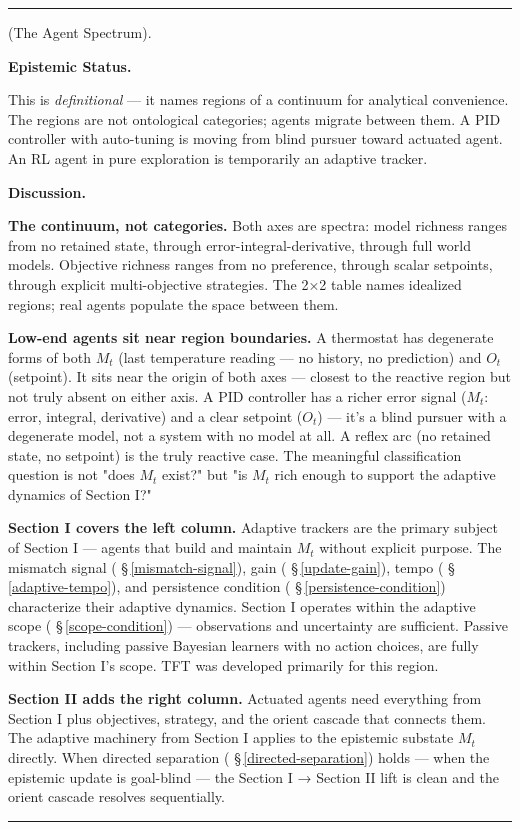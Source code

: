 \documentclass[11pt,oneside]{article}
\newcounter{claim}[section]
\renewcommand{\theclaim}{\thesection.\arabic{claim}}
\newenvironment{segment}[2]{%
  \refstepcounter{claim}%
  \bigskip\noindent\hrule\smallskip
  \noindent{\bfseries #1~\theclaim}\enskip(#2).\par\smallskip
  \noindent\ignorespaces
}{%
  \par\smallskip\noindent\hrule\bigskip
}
\newenvironment{definition}[1][]{\begin{segment}{Definition}{#1}}{\end{segment}}
\begin{document}
\begin{definition}[The Agent Spectrum]
\medskip\noindent\textbf{Epistemic Status.}


This is \textit{definitional} — it names regions of a continuum for analytical convenience. The regions are not ontological categories; agents migrate between them. A PID controller with auto-tuning is moving from blind pursuer toward actuated agent. An RL agent in pure exploration is temporarily an adaptive tracker.


\medskip\noindent\textbf{Discussion.}


\textbf{The continuum, not categories.} Both axes are spectra: model richness ranges from no retained state, through error-integral-derivative, through full world models. Objective richness ranges from no preference, through scalar setpoints, through explicit multi-objective strategies. The 2×2 table names idealized regions; real agents populate the space between them.

\textbf{Low-end agents sit near region boundaries.} A thermostat has degenerate forms of both $M_t$ (last temperature reading — no history, no prediction) and $O_t$ (setpoint). It sits near the origin of both axes — closest to the reactive region but not truly absent on either axis. A PID controller has a richer error signal ($M_t$: error, integral, derivative) and a clear setpoint ($O_t$) — it's a blind pursuer with a degenerate model, not a system with no model at all. A reflex arc (no retained state, no setpoint) is the truly reactive case. The meaningful classification question is not "does $M_t$ exist?" but "is $M_t$ rich enough to support the adaptive dynamics of Section I?"

\textbf{Section I covers the left column.} Adaptive trackers are the primary subject of Section I — agents that build and maintain $M_t$ without explicit purpose. The mismatch signal ( \S\,\ref{mismatch-signal}), gain ( \S\,\ref{update-gain}), tempo ( \S\,\ref{adaptive-tempo}), and persistence condition ( \S\,\ref{persistence-condition}) characterize their adaptive dynamics. Section I operates within the adaptive scope ( \S\,\ref{scope-condition}) — observations and uncertainty are sufficient. Passive trackers, including passive Bayesian learners with no action choices, are fully within Section I's scope. TFT was developed primarily for this region.

\textbf{Section II adds the right column.} Actuated agents need everything from Section I plus objectives, strategy, and the orient cascade that connects them. The adaptive machinery from Section I applies to the epistemic substate $M_t$ directly. When directed separation ( \S\,\ref{directed-separation}) holds — when the epistemic update is goal-blind — the Section I → Section II lift is clean and the orient cascade resolves sequentially.


\end{definition}
\end{document}
